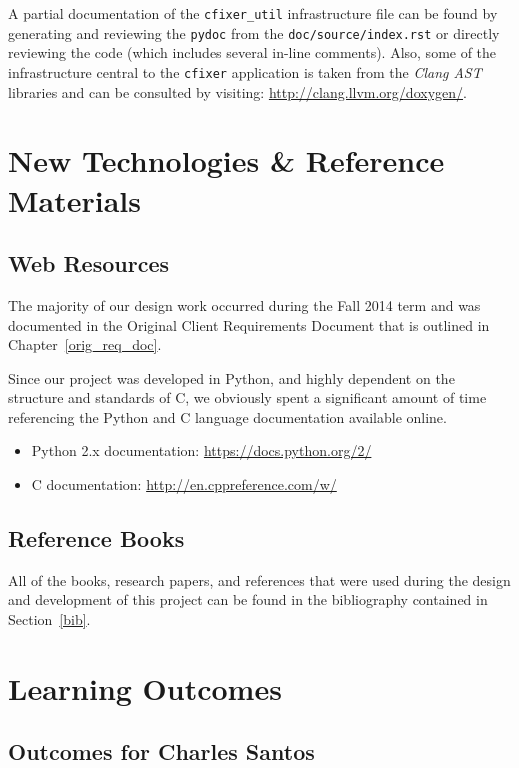 \documentclass[11pt]{scrreprt}
\begin{document}
A partial documentation of the \texttt{cfixer\_util} infrastructure file can be found by generating and reviewing the \texttt{pydoc} from the \texttt{doc/source/index.rst} or directly reviewing the code (which includes several in-line comments).
Also, some of the infrastructure central to the \texttt{cfixer} application is taken from the \textit{Clang AST} libraries and can be consulted by visiting:
\url{http://clang.llvm.org/doxygen/}.

\chapter{New Technologies \& Reference Materials}

\section{Web Resources}
The majority of our design work occurred during the Fall 2014 term and was documented in the Original Client Requirements Document that is outlined in Chapter~\ref{orig_req_doc}.

Since our project was developed in Python, and highly dependent on the structure and standards of C, we obviously spent a significant amount of time referencing the Python and C language documentation available online.

\begin{itemize}
	\item Python 2.x documentation: \url{https://docs.python.org/2/}
	\item C documentation: \url{http://en.cppreference.com/w/}
\end{itemize}

\section{Reference Books}

All of the books, research papers, and references that were used during the design and development of this project can be found in the bibliography contained in Section~\ref{bib}.

\chapter{Learning Outcomes}

\section{Outcomes for Charles Santos}
\end{document}
